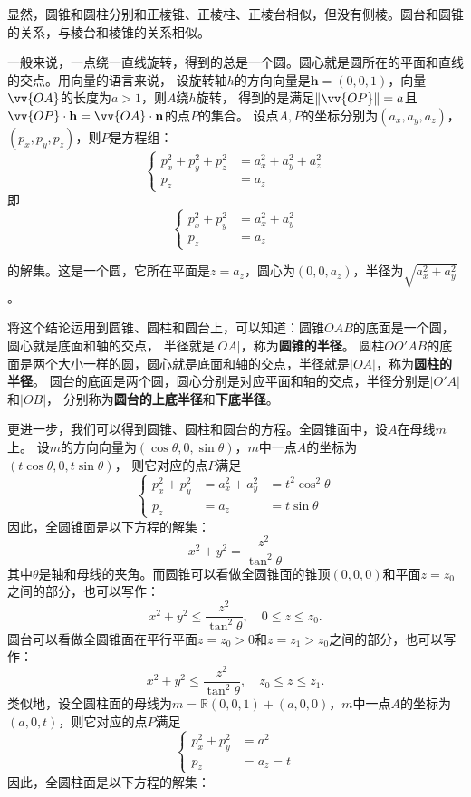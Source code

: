\documentclass[12pt,UTF8]{ctexbook}
\begin{document}
显然，圆锥和圆柱分别和正棱锥、正棱柱、正棱台相似，但没有侧棱。圆台和圆锥的关系，与棱台和棱锥的关系相似。

一般来说，一点绕一直线旋转，得到的总是一个圆。圆心就是圆所在的平面和直线的交点。用向量的语言来说，
设旋转轴$h$的方向向量是$\mathbf{h} = (0,0,1)$，向量$\vv{OA}$的长度为$a>1$，则$A$绕$h$旋转，
得到的是满足$\|\vv{OP}\| = a$且$\vv{OP}\cdot\mathbf{h}=\vv{OA}\cdot\mathbf{n}$的点$P$的集合。
设点$A,P$的坐标分别为$(a_x,a_y,a_z)$，$(p_x,p_y,p_z)$，则$P$是方程组：
$$
\left\{
\begin{array}{rl}
    p_x^2+p_y^2+p_z^2 &= a_x^2+a_y^2+a_z^2 \\
    p_z &= a_z
\end{array}
\right.
$$
即
$$
\left\{
\begin{array}{rl}
    p_x^2+p_y^2 &= a_x^2+a_y^2 \\
    p_z &= a_z
\end{array}
\right.
$$

的解集。这是一个圆，它所在平面是$z=a_z$，圆心为$(0,0,a_z)$，半径为$\sqrt{a_x^2+a_y^2}$。

将这个结论运用到圆锥、圆柱和圆台上，可以知道：圆锥$OAB$的底面是一个圆，圆心就是底面和轴的交点，
半径就是$|OA|$，称为\textbf{圆锥的半径}。
圆柱$OO'AB$的底面是两个大小一样的圆，圆心就是底面和轴的交点，半径就是$|OA|$，称为\textbf{圆柱的半径}。
圆台的底面是两个圆，圆心分别是对应平面和轴的交点，半径分别是$|O'A|$和$|OB|$，
分别称为\textbf{圆台的上底半径}和\textbf{下底半径}。

更进一步，我们可以得到圆锥、圆柱和圆台的方程。全圆锥面中，设$A$在母线$m$上。
设$m$的方向向量为$(\cos{\theta}, 0, \sin{\theta})$，$m$中一点$A$的坐标为$(t\cos{\theta}, 0, t\sin{\theta})$，
则它对应的点$P$满足
$$
\left\{
\begin{array}{rll}
    p_x^2+p_y^2 &= a_x^2+a_y^2 &= t^2\cos^2{\theta} \\
    p_z &= a_z &= t\sin{\theta}
\end{array}
\right.
$$
因此，全圆锥面是以下方程的解集：
$$ x^2 + y^2 = \frac{z^2}{\tan^2{\theta}}$$
其中$\theta$是轴和母线的夹角。而圆锥可以看做全圆锥面的锥顶$( 0,0,0)$和平面$z=z_0$之间的部分，也可以写作：
$$ x^2 + y^2 \leqslant \frac{z^2}{\tan^2{\theta}} , \quad 0\leqslant z \leqslant z_0.$$
圆台可以看做全圆锥面在平行平面$z=z_0>0$和$z=z_1 > z_0$之间的部分，也可以写作：
$$ x^2 + y^2 \leqslant \frac{z^2}{\tan^2{\theta}} , \quad z_0\leqslant z \leqslant z_1.$$
类似地，设全圆柱面的母线为$m = \mathbb{R}(0,0,1)+(a,0,0)$，$m$中一点$A$的坐标为$(a, 0, t)$，则它对应的点$P$满足
$$
\left\{
\begin{array}{rl}
    p_x^2+p_y^2 &= a^2 \\
    p_z &= a_z = t
\end{array}
\right.
$$
因此，全圆柱面是以下方程的解集：
\end{document}
